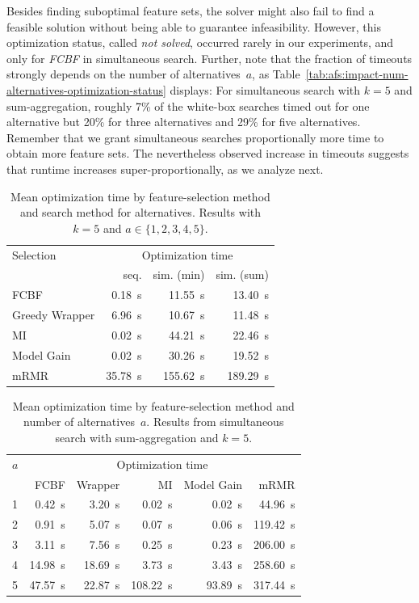 \documentclass{article}
\theoremstyle{definition}
\begin{document}
Besides finding suboptimal feature sets, the solver might also fail to find a feasible solution without being able to guarantee infeasibility.
However, this optimization status, called \emph{not solved}, occurred rarely in our experiments, and only for \emph{FCBF} in simultaneous search.
Further, note that the fraction of timeouts strongly depends on the number of alternatives~$a$, as Table~\ref{tab:afs:impact-num-alternatives-optimization-status} displays:
For simultaneous search with $k=5$ and sum-aggregation, roughly 7\% of the white-box searches timed out for one alternative but 20\% for three alternatives and 29\% for five alternatives.
Remember that we grant simultaneous searches proportionally more time to obtain more feature sets.
The nevertheless observed increase in timeouts suggests that runtime increases super-proportionally, as we analyze next.

\begin{table}[htb]
	\centering
	\begin{tabular}{lrrr}
		\toprule
		Selection & \multicolumn{3}{c}{Optimization time} \\
		\cmidrule(r){2-4}
		& seq. & sim. (min) & sim. (sum) \\
		\midrule
		FCBF & 0.18~s & 11.55~s & 13.40~s \\
		Greedy Wrapper & 6.96~s & 10.67~s & 11.48~s \\
		MI & 0.02~s & 44.21~s & 22.46~s \\
		Model Gain & 0.02~s & 30.26~s & 19.52~s \\
		mRMR & 35.78~s & 155.62~s & 189.29~s \\
		\bottomrule
	\end{tabular}
	\caption{
		Mean optimization time by feature-selection method and search method for alternatives.
		Results with $k=5$ and $a \in \{1,2,3,4,5\}$.
	}
	\label{tab:afs:impact-search-fs-method-optimization-time}
\end{table}
%
\begin{table}[htb]
	\centering
	\begin{tabular}{lrrrrr}
		\toprule
		$a$ & \multicolumn{5}{c}{Optimization time} \\
		\cmidrule(r){2-6}
		& FCBF & Wrapper & MI & Model Gain & mRMR \\
		\midrule
		1 & 0.42~s & 3.20~s & 0.02~s & 0.02~s & 44.96~s \\
		2 & 0.91~s & 5.07~s & 0.07~s & 0.06~s & 119.42~s \\
		3 & 3.11~s & 7.56~s & 0.25~s & 0.23~s & 206.00~s \\
		4 & 14.98~s & 18.69~s & 3.73~s & 3.43~s & 258.60~s \\
		5 & 47.57~s & 22.87~s & 108.22~s & 93.89~s & 317.44~s \\
		\bottomrule
	\end{tabular}
	\caption{
		Mean optimization time by feature-selection method and number of alternatives~$a$.
		Results from simultaneous search with sum-aggregation and $k=5$.
	}
	\label{tab:afs:impact-num-alternatives-fs-method-optimization-time}
\end{table}
\end{document}
